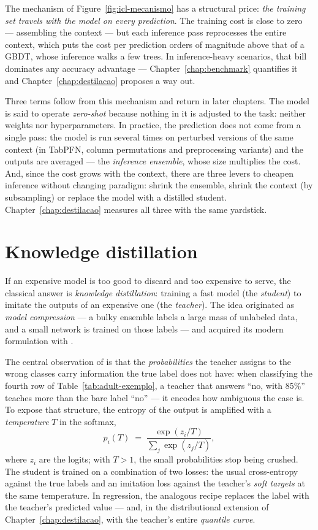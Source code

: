The mechanism of Figure~\ref{fig:icl-mecanismo} has a structural
price: \emph{the training set travels with the model on every
prediction}. The training cost is close to zero --- assembling the
context --- but each inference pass reprocesses the entire context,
which puts the cost per prediction orders of magnitude above that of
a GBDT, whose inference walks a few trees. In inference-heavy
scenarios, that bill dominates any accuracy advantage ---
Chapter~\ref{chap:benchmark} quantifies it and
Chapter~\ref{chap:destilacao} proposes a way out.

Three terms follow from this mechanism and return in later chapters.
The model is said to operate \emph{zero-shot} because nothing in it
is adjusted to the task: neither weights nor hyperparameters. In
practice, the prediction does not come from a single pass: the model
is run several times on perturbed versions of the same context (in
TabPFN, column permutations and preprocessing variants) and the
outputs are averaged --- the \emph{inference ensemble}, whose size
multiplies the cost. And, since the cost grows with the context,
there are three levers to cheapen inference without changing
paradigm: shrink the ensemble, shrink the context (by subsampling)
or replace the model with a distilled student.
Chapter~\ref{chap:destilacao} measures all three with the same
yardstick.

\section{Knowledge distillation}
\label{sec:fund-destilacao}

If an expensive model is too good to discard and too expensive to
serve, the classical answer is \emph{knowledge distillation}:
training a fast model (the \emph{student}) to imitate the outputs of
an expensive one (the \emph{teacher}). The idea originated as
\emph{model compression} \citep{bucila2006} --- a bulky ensemble
labels a large mass of unlabeled data, and a small network is
trained on those labels --- and acquired its modern formulation with
\citet{hinton2015}.

The central observation of \citet{hinton2015} is that the
\emph{probabilities} the teacher assigns to the wrong classes carry
information the true label does not have: when classifying the
fourth row of Table~\ref{tab:adult-exemplo}, a teacher that answers
``no, with 85\%'' teaches more than the bare label ``no'' --- it
encodes how ambiguous the case is. To expose that structure, the
entropy of the output is amplified with a \emph{temperature} $T$ in
the softmax,
\begin{equation}
  p_i(T) \;=\;
  \frac{\exp(z_i / T)}{\sum_j \exp(z_j / T)},
  \label{eq:temperatura}
\end{equation}
where $z_i$ are the logits; with $T > 1$, the small probabilities
stop being crushed. The student is trained on a combination of two
losses: the usual cross-entropy against the true labels and an
imitation loss against the teacher's \emph{soft targets} at the same
temperature. In regression, the analogous recipe replaces the label
with the teacher's predicted value --- and, in the distributional
extension of Chapter~\ref{chap:destilacao}, with the teacher's
entire \emph{quantile curve}.


